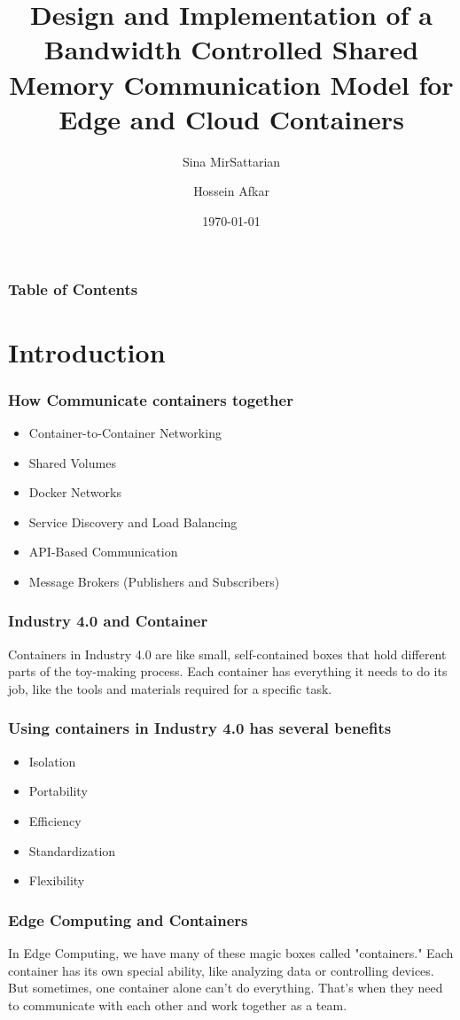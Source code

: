 \documentclass{beamer}
\title[Containers Communications]{Design and Implementation of a Bandwidth Controlled Shared Memory Communication Model for Edge and Cloud Containers}
\author[MirSattarian, Afkar]{Sina MirSattarian \and Hossein Afkar}
\institute{University of Tehran}
\date{\today}
\begin{document}
\frame{\titlepage}

\begin{frame}
    \frametitle{Table of Contents}
    \tableofcontents[hideallsubsections]
\end{frame}

\section{Introduction}
\begin{frame}
    \frametitle{How Communicate containers together}
    \begin{itemize}
    	\item Container-to-Container Networking
    	\item Shared Volumes
    	\item Docker Networks
    	\item Service Discovery and Load Balancing
    	\item API-Based Communication
        \item Message Brokers (Publishers and Subscribers)
    \end{itemize}
\end{frame}

\begin{frame}
    \frametitle{Industry 4.0 and Container}
    Containers in Industry 4.0 are like small, self-contained boxes that hold different parts of the toy-making process. Each container has everything it needs to do its job, like the tools and materials required for a specific task.
\end{frame}

\begin{frame}
    \frametitle{Using containers in Industry 4.0 has several benefits}
    \begin{itemize}
    	\item Isolation
    	\item Portability
    	\item Efficiency
    	\item Standardization
    	\item Flexibility
    \end{itemize}
\end{frame}

\begin{frame}
    \frametitle{Edge Computing and Containers}
    In Edge Computing, we have many of these magic boxes called "containers."
    Each container has its own special ability, like analyzing data or
    controlling devices. But sometimes, one container alone can't do
    everything. That's when they need to communicate with each other
    and work together as a team.
\end{frame}
\end{document}
